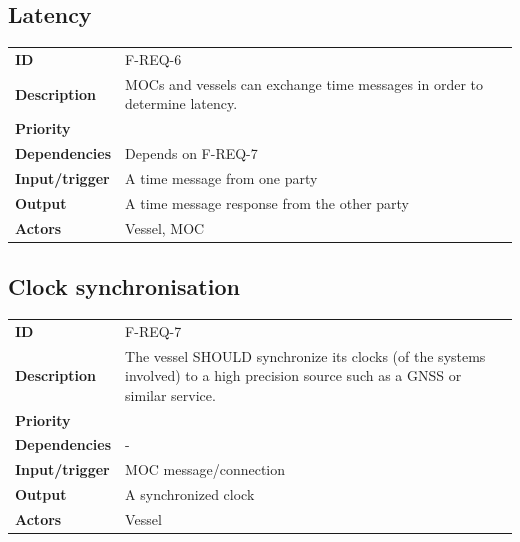 \subsection{Latency}

\begin{table}[H]
	\centering
	\begin{tabularx}{\textwidth}{ l X }
		\rowcolor[HTML]{E7E7E7}
		\textbf{ID} & F-REQ-6 \\
		\textbf{Description} & MOCs and vessels can exchange time messages in order to determine latency. \\
		\rowcolor[HTML]{E7E7E7}
		\textbf{Priority} & \priohigh \\
		\textbf{Dependencies} & Depends on F-REQ-7 \\
		\rowcolor[HTML]{E7E7E7}
		\textbf{Input/trigger} & A time message from one party \\
		\textbf{Output} & A time message response from the other party \\
		\rowcolor[HTML]{E7E7E7}
		\textbf{Actors} & Vessel, MOC \\
	\end{tabularx}
	\label{table:f-req-6}
\end{table}

\subsection{Clock synchronisation}

\begin{table}[H]
	\centering
	\begin{tabularx}{\textwidth}{ l X }
		\rowcolor[HTML]{E7E7E7}
		\textbf{ID} & F-REQ-7 \\
		\textbf{Description} & The vessel SHOULD synchronize its clocks (of the systems involved) to a high precision source such as a GNSS or similar service. \\
		\rowcolor[HTML]{E7E7E7}
		\textbf{Priority} & \prioavg \\
		\textbf{Dependencies} & - \\
		\rowcolor[HTML]{E7E7E7}
		\textbf{Input/trigger} & MOC message/connection \\
		\textbf{Output} & A synchronized clock \\
		\rowcolor[HTML]{E7E7E7}
		\textbf{Actors} & Vessel \\
	\end{tabularx}
	\label{table:f-req-7}
\end{table}

